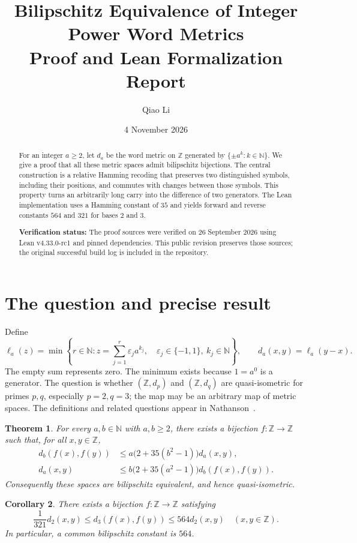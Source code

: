 \documentclass[11pt]{article}
\title{Bilipschitz Equivalence of Integer Power Word Metrics\\
\large Proof and Lean Formalization Report}
\author{Qiao Li}
\date{4 November 2026}
\newtheorem{theorem}{Theorem}
\newtheorem{corollary}[theorem]{Corollary}
\newcommand{\Z}{\mathbb Z}
\newcommand{\N}{\mathbb N}
\newcommand{\verificationstatus}{The proof sources were verified on 26 September 2026 using Lean
v4.33.0-rc1 and pinned dependencies. This public revision preserves those
sources; the original successful build log is included in the repository.}
\begin{document}
\maketitle

\begin{abstract}
For an integer $a\ge2$, let $d_a$ be the word metric on $\Z$ generated by
$\{\pm a^k:k\in\N\}$. We give a proof that all these metric spaces admit
bilipschitz bijections. The central construction is a relative Hamming
recoding that preserves two distinguished symbols, including their positions,
and commutes with changes between those symbols. This property turns an
arbitrarily long carry into the difference of two generators. The Lean
implementation uses a Hamming constant of $35$ and yields forward and reverse
constants $564$ and $321$ for bases $2$ and $3$.
\par\smallskip\noindent\textbf{Verification status:} \verificationstatus
\end{abstract}

\section{The question and precise result}
Define
\[
 \ell_a(z)=\min\left\{r\in\N:
 z=\sum_{j=1}^{r}\varepsilon_j a^{k_j},\quad
 \varepsilon_j\in\{-1,1\},\ k_j\in\N\right\},
 \qquad d_a(x,y)=\ell_a(y-x).
\]
The empty sum represents zero. The minimum exists because $1=a^0$ is a
generator. The question is whether $(\Z,d_p)$ and $(\Z,d_q)$ are
quasi-isometric for primes $p,q$, especially $p=2,q=3$; the map may be an
arbitrary map of metric spaces. The definitions and related questions appear
in Nathanson~\cite[Section 4, Problems 1--2]{nathanson}.

\begin{theorem}\label{thm:main}
For every $a,b\in\N$ with $a,b\ge2$, there exists a bijection
$f:\Z\to\Z$ such that, for all $x,y\in\Z$,
\begin{align}
 d_b(f(x),f(y))&\le a\bigl(2+35(b^2-1)\bigr)d_a(x,y),\label{eq:forward}\\
 d_a(x,y)&\le b\bigl(2+35(a^2-1)\bigr)d_b(f(x),f(y)).\label{eq:reverse}
\end{align}
Consequently these spaces are bilipschitz equivalent, and hence
quasi-isometric.
\end{theorem}

\begin{corollary}\label{cor:23}
There exists a bijection $f:\Z\to\Z$ satisfying
\[
 \frac{1}{321}d_2(x,y)\le d_3(f(x),f(y))\le564d_2(x,y)
 \quad(x,y\in\Z).
\]
In particular, a common bilipschitz constant is $564$.
\end{corollary}
\end{document}
